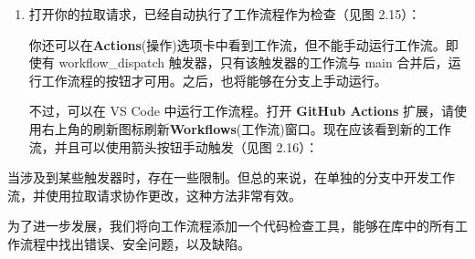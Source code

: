 \begin{enumerate}
\begin{shell}
$ git push -u origin new-workflow
\end{shell}

\item 
接下来，我们将为新分支创建一个拉取请求。因为使用了 pull\_request 触发器，这将自动运行新工作流。在浏览器中转到库并导航到 \textbf{Pull requests}(拉取请求)。Git 检测到已经推送了一个新分支，并会提供给创建拉取请求的选项（比较 \& 拉取请求，见图 2.13）：

\myGraphic{0.6}{content/chapter2/images/13.png}{图2.13 --- 浏览器中创建一个新的拉取请求}

只需保留默认标题（你之前添加的提交信息）然后点击 、\textbf{Create pull request}(创建拉取请求)（见图 2.14）：

\myGraphic{0.6}{content/chapter2/images/14.png}{图2.14 --- 创建一个带有标题和描述的拉取请求}

也可以使用 GitHub CLI 创建拉取请求：

\begin{shell}
$ gh pr create --fill
\end{shell}

\begin{myTip}{GitHub CLI}
在本书中，将大量使用 GitHub CLI (\url{https://cli.github.com/})，其适用于所有平台，可以通过许多包管理器（Homebrew、WinGet、RPM 等）获取。有关更多安装说明，请参阅 \url{https://github.com/cli/cli#installation}。安装后，需要使用 \verb|gh auth login| 进行身份验证（请参阅 \url{https://cli.github.com/manual/gh_auth_login}）。
\end{myTip}

\item 
打开你的拉取请求，已经自动执行了工作流程作为检查（见图 2.15）：


你还可以在\textbf{Actions}(操作)选项卡中看到工作流，但不能手动运行工作流。即使有 workflow\_dispatch 触发器，只有该触发器的工作流与 main 合并后，运行工作流程的按钮才可用。之后，也将能够在分支上手动运行。

不过，可以在 VS Code 中运行工作流程。打开 \textbf{GitHub Actions} 扩展，请使用右上角的刷新图标刷新\textbf{Workflows}(工作流)窗口。现在应该看到新的工作流，并且可以使用箭头按钮手动触发（见图 2.16）：

\end{enumerate}


当涉及到某些触发器时，存在一些限制。但总的来说，在单独的分支中开发工作流，并使用拉取请求协作更改，这种方法非常有效。


为了进一步发展，我们将向工作流程添加一个代码检查工具，能够在库中的所有工作流程中找出错误、安全问题，以及缺陷。